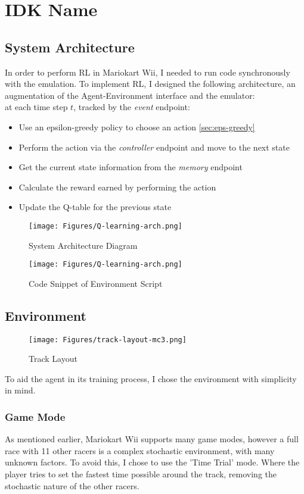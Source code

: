\chapter{IDK Name}
\section{System Architecture}
In order to perform RL in Mariokart Wii, I needed to run code synchronously with the emulation. To implement RL, I designed the following architecture, an augmentation of the Agent-Environment interface and the emulator:\\at each time step $t$, tracked by the \textit{event} endpoint:
\begin{itemize}
    \item Use an epsilon-greedy policy to choose an action \ref{sec:eps-greedy}
    \item Perform the action via the \textit{controller} endpoint and move to the next state
    \item Get the current state information from the \textit{memory} endpoint
    \item Calculate the reward earned by performing the action
    \item Update the Q-table for the previous state
\end{itemize}
\begin{figure}[hb]
    \centering
    \texttt{[image: Figures/Q-learning-arch.png]}
    \caption{System Architecture Diagram}
    \label{fig:q-learning-arch}
\end{figure}
\begin{figure}[hb]
    \centering
    \texttt{[image: Figures/Q-learning-arch.png]}
    \caption{Code Snippet of Environment Script}
    \label{fig:code-dolphin-env}
\end{figure}
\section{Environment}
\begin{figure}[bht]
    \centering
    \texttt{[image: Figures/track-layout-mc3.png]}
    \caption{Track Layout}
    \label{fig:track-layout}
\end{figure}
To aid the agent in its training process, I chose the environment with simplicity in mind.
\subsection{Game Mode}
As mentioned earlier, Mariokart Wii supports many game modes, however a full race with 11 other racers is a complex stochastic environment, with many unknown factors. To avoid this, I chose to use the 'Time Trial' mode. Where the player tries to set the fastest time possible around the track, removing the stochastic nature of the other racers. 
